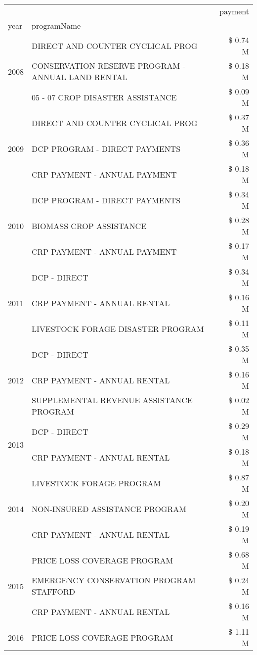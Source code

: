 \begin{tabular}{llr}
\toprule
 &  & payment \\
year & programName &  \\
\midrule
\multirow[t]{3}{*}{2008} & DIRECT AND COUNTER CYCLICAL PROG & \$ 0.74 M \\
 & CONSERVATION RESERVE PROGRAM - ANNUAL LAND RENTAL & \$ 0.18 M \\
 & 05 - 07 CROP DISASTER ASSISTANCE & \$ 0.09 M \\
\cline{1-3}
\multirow[t]{3}{*}{2009} & DIRECT AND COUNTER CYCLICAL PROG & \$ 0.37 M \\
 & DCP PROGRAM - DIRECT PAYMENTS & \$ 0.36 M \\
 & CRP PAYMENT - ANNUAL PAYMENT & \$ 0.18 M \\
\cline{1-3}
\multirow[t]{3}{*}{2010} & DCP PROGRAM - DIRECT PAYMENTS & \$ 0.34 M \\
 & BIOMASS CROP ASSISTANCE & \$ 0.28 M \\
 & CRP PAYMENT - ANNUAL PAYMENT & \$ 0.17 M \\
\cline{1-3}
\multirow[t]{3}{*}{2011} & DCP - DIRECT & \$ 0.34 M \\
 & CRP PAYMENT - ANNUAL RENTAL & \$ 0.16 M \\
 & LIVESTOCK FORAGE DISASTER PROGRAM & \$ 0.11 M \\
\cline{1-3}
\multirow[t]{3}{*}{2012} & DCP - DIRECT & \$ 0.35 M \\
 & CRP PAYMENT - ANNUAL RENTAL & \$ 0.16 M \\
 & SUPPLEMENTAL REVENUE ASSISTANCE PROGRAM & \$ 0.02 M \\
\cline{1-3}
\multirow[t]{2}{*}{2013} & DCP - DIRECT & \$ 0.29 M \\
 & CRP PAYMENT - ANNUAL RENTAL & \$ 0.18 M \\
\cline{1-3}
\multirow[t]{3}{*}{2014} & LIVESTOCK FORAGE PROGRAM & \$ 0.87 M \\
 & NON-INSURED ASSISTANCE PROGRAM & \$ 0.20 M \\
 & CRP PAYMENT - ANNUAL RENTAL & \$ 0.19 M \\
\cline{1-3}
\multirow[t]{3}{*}{2015} & PRICE LOSS COVERAGE PROGRAM & \$ 0.68 M \\
 & EMERGENCY CONSERVATION PROGRAM STAFFORD & \$ 0.24 M \\
 & CRP PAYMENT - ANNUAL RENTAL & \$ 0.16 M \\
\cline{1-3}
\multirow[t]{3}{*}{2016} & PRICE LOSS COVERAGE PROGRAM                   & \$ 1.11 M \\

\end{tabular}
